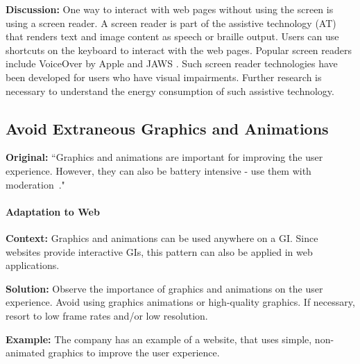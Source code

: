 \textbf{Discussion:} One way to interact with web pages without using the screen is using a screen reader. A screen reader is part of the assistive technology (AT) that renders text and image content as speech or braille output. Users can use shortcuts on the keyboard to interact with the web pages. Popular screen readers include VoiceOver by Apple \cite{VoiceOver-Apple} and JAWS \cite{JAWS}. Such screen reader technologies have been developed for users who have visual impairments. Further research is necessary to understand the energy consumption of such assistive technology.



\subsection{Avoid Extraneous Graphics and Animations} \label{sec:patterns-AvoidExtraneousGraphicsAndAnimations}
\textbf{Original:} ``Graphics and animations are important for improving the user experience. However, they can also be battery intensive - use them with moderation~\cite{cruz2019catalog}."

\paragraph{Adaptation to Web}\mbox{}

\textbf{Context:} Graphics and animations can be used anywhere on a GI. Since websites provide interactive GIs, this pattern can also be applied in web applications.

\textbf{Solution:} Observe the importance of graphics and animations on the user experience. Avoid using graphics animations or high-quality graphics. If necessary, resort to low frame rates and/or low resolution.

\textbf{Example:} The company has an example of a website, that uses simple, non-animated graphics to improve the user experience.

 


